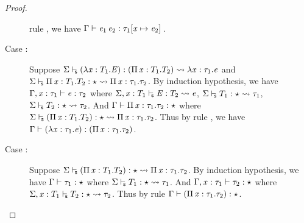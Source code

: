 \begin{proof}
\begin{description}
rule , we have $\Gamma  \vdash  \mathit{e_{{\mathrm{1}}}} \, \mathit{e_{{\mathrm{2}}}}  :  \tau_{{\mathrm{1}}}  [  \mathit{x}  \mapsto  \mathit{e_{{\mathrm{2}}}}  ] \,$.
        \item[Case \ruleref{TR\_Lam}:] Suppose $ \Sigma  \vdash_{\!\!\mathsf{s} }  (  \lambda  \mathit{x}  :  T_{{\mathrm{1}}}  .  \mathit{E}  )  :  (  \Pi \, \mathit{x}  :  T_{{\mathrm{1}}}  .  T_{{\mathrm{2}}}  )   \rightsquigarrow   \lambda  \mathit{x}  :  \tau_{{\mathrm{1}}}  .  \mathit{e} $ and $ \Sigma  \vdash_{\!\!\mathsf{s} }  \Pi \, \mathit{x}  :  T_{{\mathrm{1}}}  .  T_{{\mathrm{2}}}  :  \star   \rightsquigarrow   \Pi \, \mathit{x}  :  \tau_{{\mathrm{1}}}  .  \tau_{{\mathrm{2}}} $. By induction
hypothesis, we have $\Gamma  ,  \mathit{x}  :  \tau_{{\mathrm{1}}}  \vdash  \mathit{e}  :  \tau_{{\mathrm{2}}}$ where $ \Sigma  ,  \mathit{x}  :  T_{{\mathrm{1}}}  \vdash_{\!\!\mathsf{s} }  \mathit{E}  :  T_{{\mathrm{2}}}   \rightsquigarrow   \mathit{e} $, $ \Sigma  \vdash_{\!\!\mathsf{s} }  T_{{\mathrm{1}}}  :  \star   \rightsquigarrow   \tau_{{\mathrm{1}}} $, $ \Sigma  \vdash_{\!\!\mathsf{s} }  T_{{\mathrm{2}}}  :  \star   \rightsquigarrow   \tau_{{\mathrm{2}}} $. And $\Gamma  \vdash  \Pi \, \mathit{x}  :  \tau_{{\mathrm{1}}}  .  \tau_{{\mathrm{2}}}  :  \star$ where $ \Sigma  \vdash_{\!\!\mathsf{s} }  (  \Pi \, \mathit{x}  :  T_{{\mathrm{1}}}  .  T_{{\mathrm{2}}}  )  :  \star   \rightsquigarrow   \Pi \, \mathit{x}  :  \tau_{{\mathrm{1}}}  .  \tau_{{\mathrm{2}}} $. Thus by
rule , we have $\Gamma  \vdash  (  \lambda  \mathit{x}  :  \tau_{{\mathrm{1}}}  .  \mathit{e}  )  :  (  \Pi \, \mathit{x}  :  \tau_{{\mathrm{1}}}  .  \tau_{{\mathrm{2}}}  )$.
        \item[Case \ruleref{TR\_Pi}:] Suppose $ \Sigma  \vdash_{\!\!\mathsf{s} }  (  \Pi \, \mathit{x}  :  T_{{\mathrm{1}}}  .  T_{{\mathrm{2}}}  )  :  \star   \rightsquigarrow   \Pi \, \mathit{x}  :  \tau_{{\mathrm{1}}}  .  \tau_{{\mathrm{2}}} $. By induction hypothesis, we have $\Gamma  \vdash  \tau_{{\mathrm{1}}}  :  \star$ where $ \Sigma  \vdash_{\!\!\mathsf{s} }  T_{{\mathrm{1}}}  :  \star   \rightsquigarrow   \tau_{{\mathrm{1}}} $. And $\Gamma  ,  \mathit{x}  :  \tau_{{\mathrm{1}}}  \vdash  \tau_{{\mathrm{2}}}  :  \star$ where $ \Sigma  ,  \mathit{x}  :  T_{{\mathrm{1}}}  \vdash_{\!\!\mathsf{s} }  T_{{\mathrm{2}}}  :  \star   \rightsquigarrow   \tau_{{\mathrm{2}}} $. Thus by rule  $\Gamma  \vdash  (  \Pi \, \mathit{x}  :  \tau_{{\mathrm{1}}}  .  \tau_{{\mathrm{2}}}  )  :  \star$.

\end{description}
\end{proof}
